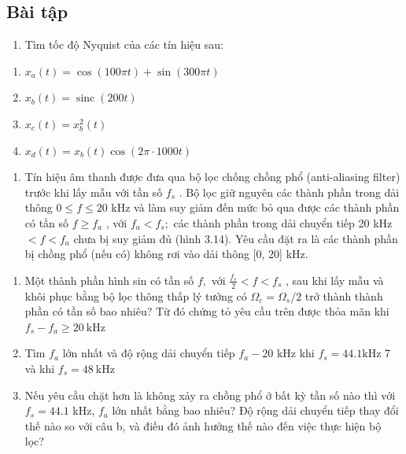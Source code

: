 \documentclass[
  10
]{article}
\providecommand{\tightlist}{%
  \setlength{\itemsep}{0pt}\setlength{\parskip}{0pt}}
\begin{document}
\subsection{Bài tập}\label{buxe0i-tux1eadp-3}

\begin{enumerate}
\def\labelenumi{\arabic{enumi}.}
\tightlist
\item
  Tìm tốc độ Nyquist của các tín hiệu sau:
\end{enumerate}

\begin{enumerate}
\def\labelenumi{\alph{enumi}.}
\item
  \(x _ { a } ( t ) = \cos ( 1 0 0 \pi t ) + \sin ( 3 0 0 \pi t )\)
\item
  \(x _ { b } ( t ) = \operatorname { s i n c } ( 2 0 0 t )\)
\item
  \(x _ { c } ( t ) = x _ { b } ^ { 2 } ( t )\)
\item
  \(x _ { d } ( t ) = x _ { b } ( t ) \cos ( 2 \pi \cdot 1 0 0 0 t )\)
\end{enumerate}

\begin{enumerate}
\def\labelenumi{\arabic{enumi}.}
\setcounter{enumi}{1}
\tightlist
\item
  Tín hiệu âm thanh được đưa qua bộ lọc chống chồng phổ (anti-aliasing
  filter) trước khi lấy mẫu với tần số \(f _ { s }\) . Bộ lọc giữ nguyên
  các thành phần trong dải thông \(0 \leq f \leq 2 0\) kHz và làm suy
  giảm đến mức bỏ qua được các thành phần có tần số \(f \geq f _ { a }\)
  , với \(f _ { a } < f _ { s } ;\) các thành phần trong dải chuyển tiếp
  20 kHz \(< f < f _ { a }\) chưa bị suy giảm đủ (hình 3.14). Yêu cầu
  đặt ra là các thành phần bị chồng phổ (nếu có) không rơi vào dải thông
  {[}0, 20{]} kHz.
\end{enumerate}

\begin{enumerate}
\def\labelenumi{\alph{enumi}.}
\item
  Một thành phần hình sin có tần số \(f ,\) với
  \(\textstyle { \frac { f _ { s } } { 2 } } < f < f _ { s }\) , sau khi
  lấy mẫu và khôi phục bằng bộ lọc thông thấp lý tưởng có
  \(\Omega _ { c } = \Omega _ { s } / 2\) trở thành thành phần có tần số
  bao nhiêu? Từ đó chứng tỏ yêu cầu trên được thỏa mãn khi
  \(f _ { s } - f _ { a } \geq 2 0 ~ \mathrm { k H z }\)
\item
  Tìm \(f _ { a }\) lớn nhất và độ rộng dải chuyển tiếp
  \(f _ { a } - 2 0\) kHz khi
  \(f _ { s } = 4 4 . 1 \mathrm { { k H z } }\) 7 và khi
  \(f _ { s } = 4 8 ~ \mathrm { k H z }\)
\item
  Nếu yêu cầu chặt hơn là không xảy ra chồng phổ ở bất kỳ tần số nào thì
  với \(f _ { s } = 4 4 . 1\) kHz, \(f _ { a }\) lớn nhất bằng bao
  nhiêu? Độ rộng dải chuyển tiếp thay đổi thế nào so với câu b, và điều
  đó ảnh hưởng thế nào đến việc thực hiện bộ lọc?
\end{enumerate}
\end{document}

